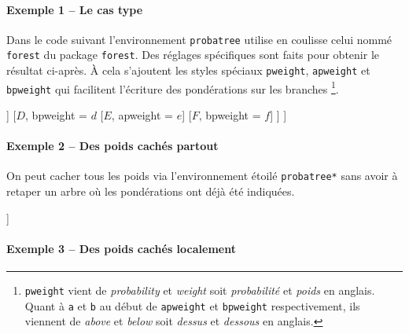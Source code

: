 \documentclass[12pt,a4paper]{article}
\theoremstyle{definition}
\begin{document}


\paragraph{Exemple 1 -- Le cas type}

Dans le code suivant l'environnement \verb+probatree+ utilise en coulisse celui nommé \verb+forest+ du package \verb+forest+. Des réglages spécifiques sont faits pour obtenir le résultat ci-après.
À cela s'ajoutent les styles spéciaux \verb+pweight+, \verb+apweight+ et \verb+bpweight+ qui facilitent l'écriture des pondérations sur les branches
\footnote{
    \texttt{pweight} vient de \emph{\og probability \fg} et \emph{\og weight\fg} soit \emph{\og probabilité \fg} et \emph{\og poids\fg} en anglais.
    Quant à \texttt{a} et \texttt{b} au début de \texttt{apweight} et \texttt{bpweight} respectivement, ils viennent de \emph{\og above \fg} et \emph{\og below\fg} soit \emph{\og dessus \fg} et \emph{\og dessous\fg} en anglais.
}.

\begin{latexex}
\begin{probatree}
    [
        [$A$, pweight = $a$
            [$B$, pweight = $b$]
            [$C$, pweight = $c$]
        ]
        [$D$, bpweight = $d$
            [$E$, apweight = $e$]
            [$F$, bpweight = $f$]
        ]
    ]
\end{probatree}
\end{latexex}




\paragraph{Exemple 2 -- Des poids cachés partout}

On peut cacher tous les poids via l'environnement étoilé \verb+probatree*+ sans avoir à retaper un arbre où les pondérations ont déjà été indiquées.

\begin{latexex}
\begin{probatree*}
    [$A$, pweight = $a$
        [$B$, pweight = $b$]
        [$C$, pweight = $c$]
    ]
\end{probatree*}
\end{latexex}




\paragraph{Exemple 3 -- Des poids cachés localement}
\end{document}
